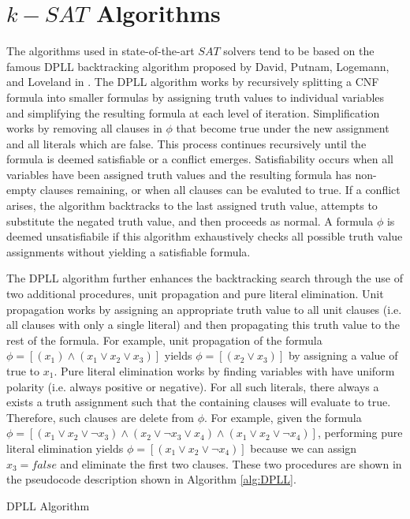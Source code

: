 \documentclass[paper=a4, fontsize=11pt]{scrartcl} %
\begin{document}
\section{$k-SAT$ Algorithms}
The algorithms used in state-of-the-art $SAT$ solvers tend to be based on the famous
DPLL backtracking algorithm proposed by David, Putnam, Logemann, and Loveland in \cite{DPLL}.
The DPLL algorithm works by recursively splitting a CNF formula into smaller formulas
by assigning truth values to individual variables and simplifying the resulting
formula at each level of iteration. Simplification works by removing all clauses in $\phi$ that
become true under the new assignment and all literals which are false. 
This process continues recursively until the formula is deemed satisfiable
or a conflict emerges. Satisfiability occurs when all variables have been assigned truth values 
and the resulting formula has non-empty clauses remaining, or when all clauses can be
evaluted to true. If a conflict arises, the algorithm backtracks to
the last assigned truth value, attempts to substitute the negated truth value, and then proceeds
as normal. A formula $\phi$ is deemed unsatisfiabile if this algorithm exhaustively
checks all possible truth value assignments without yielding a satisfiable formula. 

The DPLL algorithm further enhances the backtracking search through the use of two additional
procedures, unit propagation and pure literal elimination. Unit propagation works by assigning
an appropriate truth value to all unit clauses (i.e. all clauses with only a single literal) and
then propagating this truth value to the rest of the formula. For example, unit propagation
of the formula $\phi = [(x_1) \land (x_1 \lor x_2 \lor x_3)]$ yields $\phi = [(x_2 \lor x_3)]$ by
assigning a value of true to $x_1$. Pure literal elimination works by finding variables
with have uniform polarity (i.e. always positive or negative). For all such literals, there
always a exists a truth assignment such that the containing clauses will evaluate to true.
Therefore, such clauses are delete from $\phi$. For example, given the formula 
$\phi = [(x_1 \lor x_2 \lor \lnot x_3) \land (x_2 \lor \lnot x_3 \lor x_4) \land (x_1 \lor x_2 \lor \lnot x_4)]$,
performing pure literal elimination yields 
$\phi = [(x_1 \lor x_2 \lor \lnot x_4)]$ because we can assign $x_3 = false$ and eliminate
the first two clauses. These two procedures are shown in the pseudocode description shown
in Algorithm \ref{alg:DPLL}.

\begin{algorithm}[t] %
\caption{DPLL Algorithm} \label{alg:DPLL}
\begin{algorithmic}[1]
\Require{$\phi$}
\end{algorithmic}
\end{algorithm}
\end{document}

